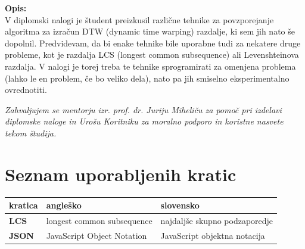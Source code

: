 \documentclass[a4paper,12pt,openright]{book}
\newcommand{\clearemptydoublepage}{\newpage{\pagestyle{empty}\cleardoublepage}}
\begin{document}
\bigskip
\noindent\textbf{Opis:}\\
V diplomski nalogi \cite{diplomaPremk} je študent preizkusil različne tehnike za povzporejanje algoritma za izračun DTW (dynamic time warping) razdalje, ki sem jih nato še dopolnil. Predvidevam, da bi enake tehnike bile uporabne tudi za nekatere druge probleme, kot je razdalja LCS (longest common subsequence) ali Levenshteinova razdalja. V nalogi je torej treba te tehnike sprogramirati za omenjena problema (lahko le en problem, če bo veliko dela), nato pa jih smiselno eksperimentalno ovrednotiti.


\vfill

\vspace{2cm}

\clearemptydoublepage

\thispagestyle{empty}\mbox{}\vfill\null\it%
\noindent
Zahvaljujem se mentorju izr. prof. dr. Juriju Miheliču za pomoč pri izdelavi diplomske naloge in Urošu Koritniku za moralno podporo in koristne nasvete tekom študija. 
\rm\normalfont

\clearemptydoublepage

\thispagestyle{empty}\mbox{}{\textheight}\mbox{}\hfill\begin{minipage}{0.55\textwidth}%
\normalfont\end{minipage}

\clearemptydoublepage

\pagestyle{empty}
\def\thepage{}%
\tableofcontents{}

\clearemptydoublepage


\chapter*{Seznam uporabljenih kratic}

\noindent\begin{tabular}{p{}|p{}|p{}}    %
  {\bf kratica} & {\bf angleško}                              & {\bf slovensko} \\ \hline
  {\bf LCS}      & longest common subsequence               & najdaljše skupno podzaporedje \\
  {\bf JSON} & JavaScript Object Notation & JavaScript objektna notacija \\
\end{tabular}
\end{document}
